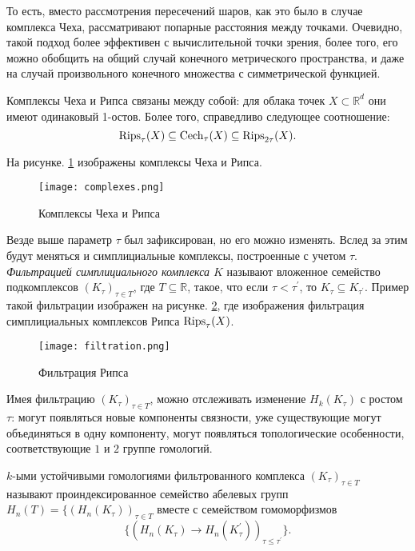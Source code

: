 То есть, вместо рассмотрения пересечений шаров, как это было в случае комплекса Чеха, рассматривают попарные расстояния между точками. Очевидно, такой подход более эффективен с вычислительной точки зрения, более того, его можно обобщить на общий случай конечного метрического пространства, и даже на случай произвольного конечного множества с симметрической функцией.

Комплексы Чеха и Рипса связаны между собой: для облака точек $X \subset \mathbb{R}^d$ они имеют одинаковый 1-остов. Более того, справедливо следующее соотношение:
\[
	\mathrm{Rips}_\tau(X) \subseteq \mathrm{Cech}_\tau(X) \subseteq \mathrm{Rips}_{2\tau}(X).
\]

На рисунке. \ref{complexes} изображены комплексы Чеха и Рипса.

\begin{figure}[!htbp]
	\begin{center}
		\texttt{[image: complexes.png]}\\
		\caption{Комплексы Чеха и Рипса}
		\label{complexes}
	\end{center}
\end{figure}

Везде выше параметр $\tau$ был зафиксирован, но его можно изменять. Вслед за этим будут меняться и симплициальные комплексы, построенные с учетом $\tau$. {\it Фильтрацией симплициального комплекса $K$} называют вложенное семейство подкомплексов $ (K_\tau)_{\tau \in T} $, где $ T \subseteq \mathbb{R} $, такое, что если $ \tau < \tau^{'} $, то $ K_\tau \subseteq K_{\tau^{'}} $. Пример такой фильтрации изображен на рисунке. \ref{ripsfilt}, где изображения фильтрация симплициальных комплексов Рипса $\mathrm{Rips}_\tau(X)$.

\begin{figure}[!htbp]
	\begin{center}
		\texttt{[image: filtration.png]}\\
		\caption{Фильтрация Рипса}
		\label{ripsfilt}
	\end{center}
\end{figure}

Имея фильтрацию $(K_\tau)_{\tau \in T}$, можно отслеживать изменение $H_k(K_\tau)$ с ростом $\tau$: могут появляться новые компоненты связности, уже существующие могут объединяться в одну компоненту, могут появляться топологические особенности, соответствующие $1$ и $2$ группе гомологий. 
\begin{definition}
	$k$-ыми устойчивыми гомологиями фильтрованного комплекса $ (K_\tau)_{\tau \in T} $ называют  проиндексированное семейство абелевых групп $H_n(T) = \{ (H_n(K_\tau))_{\tau \in T} $ вместе с семейством гомоморфизмов 
	\[\{(H_n(K_\tau) \to H_n(K_\tau^{'}))_{\tau \leq \tau^{'}} \}.\]
\end{definition}

